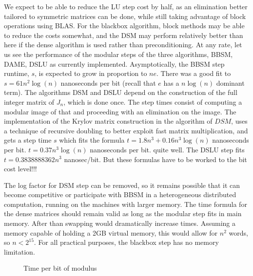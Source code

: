 \documentclass{acm_proc_article-sp}
\begin{document}
We expect to be able to reduce the LU step cost
by half, as an elimination better tailored to symmetric matrices can be done, while still taking
advantage of block operations using BLAS. For the blackbox algorithm, block methods may 
be able to reduce the costs somewhat, and the DSM may perform relatively better than
here if the dense \charpoly{} algorithm \cite{Pernet03} %
is used rather than preconditioning.
At any rate, let us see the performance of the modular steps of the three algorithms,
BBSM, DAME, DSLU as currently implemented.
Asymptotically, the BBSM step runtime, $s$, is expected to grow in
proportion to $ne$. There was a good fit to $s = 61 n^2\log(n)$ nanoseconds per bit
(recall that $e$ has a $n\log(n)$ dominant term).
The algorithms DSM and DSLU depend on the construction of the full integer matrix of 
$J_n$, which is done once.  The step times consist of computing a modular
image of that and proceeding with an elimination on the image.
The implementation of the Krylov matrix construction in the \minpoly{} algorithm of $DSM$,
uses a technique of recursive doubling to better exploit fast matrix multiplication,
and gets a step time $s$ which fits the formula 
$t = 1.8   n^3  + 0.16  n^3 \log(n)$ nanoseconds per bit.
$t = 0.37 n^3 \log(n)$ nanoseconds per bit.
quite well.  
The DSLU step fits 
$t = 0.3838888362 n^3$ nanosec/bit.
But these formulas have to be worked to the bit cost level!!!

The log factor for DSM step can be removed, so it remains possible that it can become 
competitive or participate with BBSM in a heterogeneous distributed computation, running
on the machines with larger memory.  
The time formula for the dense matrices should remain valid as long as the modular
step fits in main memory. After than swapping would dramatically increase times.
Assuming a memory capable of holding a 2GB virtual memory,
this would allow for $n^2$ words, so $n < 2^{15}$.  For all practical purposes,
the blackbox step has no memory limitation.
\begin{figure}[h]
\caption{Time per bit of modulus}
\end{figure}
\end{document}
